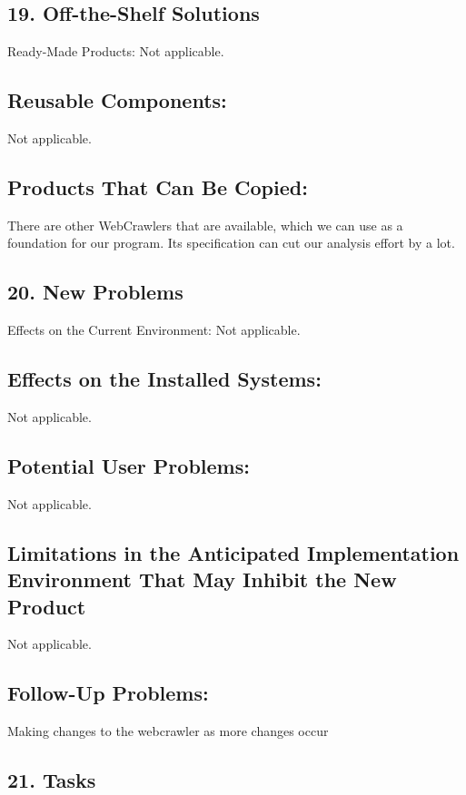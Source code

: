 \documentclass[12pt]{article}
\begin{document}
\subsection{19. Off-the-Shelf Solutions }
Ready-Made Products:
Not applicable.

\subsection{Reusable Components:}
Not applicable.

\subsection{Products That Can Be Copied:}
There are other WebCrawlers that are available, which we can use as a foundation for our program. Its specification can cut our analysis effort by a lot.

\subsection{20. New Problems }
Effects on the Current Environment:
Not applicable.

\subsection{Effects on the Installed Systems:}
Not applicable.

\subsection{Potential User Problems:}
Not applicable.

\subsection{Limitations in the Anticipated Implementation Environment That May Inhibit the New Product}

Not applicable.

\subsection{Follow-Up Problems:}
Making changes to the webcrawler as more changes occur 

\subsection{21. Tasks} 
\end{document}
